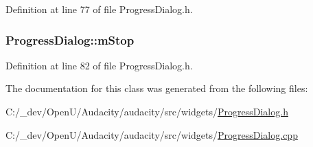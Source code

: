 Definition at line 77 of file Progress\+Dialog.\+h.

\subsubsection[{\texorpdfstring{m\+Stop}{mStop}}]{ Progress\+Dialog\+::m\+Stop\hspace{0.3cm}{\ttfamily [protected]}}\hypertarget{class_progress_dialog_a18d928e615df260cf299fec8ea92ea8d}{}\label{class_progress_dialog_a18d928e615df260cf299fec8ea92ea8d}


Definition at line 82 of file Progress\+Dialog.\+h.



The documentation for this class was generated from the following files\+:\begin{DoxyCompactItemize}
\item 
C\+:/\+\_\+dev/\+Open\+U/\+Audacity/audacity/src/widgets/\hyperlink{_progress_dialog_8h}{Progress\+Dialog.\+h}\item 
C\+:/\+\_\+dev/\+Open\+U/\+Audacity/audacity/src/widgets/\hyperlink{_progress_dialog_8cpp}{Progress\+Dialog.\+cpp}\end{DoxyCompactItemize}
